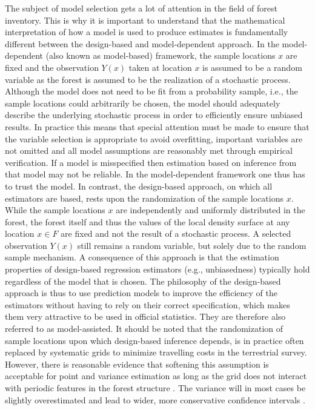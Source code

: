 The subject of model selection gets a lot of attention in the field of forest inventory. This is why it is important to understand that the mathematical interpretation of how a model is used to produce estimates is fundamentally different between the design-based and model-dependent approach. In the model-dependent (also known as model-based) framework, the sample locations $x$ are fixed and the observation $Y(x)$ taken at location $x$ is assumed to be a random variable as the forest is assumed to be the realization of a stochastic process. Although the model does not need to be fit from a probability sample, i.e., the sample locations could arbitrarily be chosen, the model should adequately describe the underlying stochastic process in order to efficiently ensure unbiased results. In practice this means that special attention must be made to ensure that the variable selection is appropriate to avoid overfitting, important variables are not omitted and all model assumptions are reasonably met through empirical verification. If a model is misspecified then estimation based on inference from that model may not be reliable. In the model-dependent framework one thus has to trust the model. In contrast, the design-based approach, on which all  estimators are based, rests upon the randomization of the sample locations $x$. While the sample locations $x$ are independently and uniformly distributed in the forest, the forest itself and thus the values of the local density surface at any location $x \in F$ are fixed and not the result of a stochastic process. A selected observation $Y(x)$ still remains a random variable, but solely due to the random sample mechanism. A consequence of this approach is that the estimation properties of design-based regression estimators (e.g., unbiasedness) typically hold regardless of the model that is chosen. The philosophy of the design-based approach is thus to use prediction models to improve the efficiency of the estimators without having to rely on their correct specification, which makes them very attractive to be used in official statistics. They are therefore also referred to as model-assisted. It should be noted that the randomization of sample locations upon which design-based inference depends, is in practice often replaced by systematic grids to minimize travelling costs in the terrestrial survey. However, there is reasonable evidence that softening this assumption is acceptable for point and variance estimation as long as the grid does not interact with periodic features in the forest structure \citep{mandallaz2008}. The variance will in most cases be slightly overestimated and lead to wider, more conservative confidence intervals \citep{mandallaz2013a}.

